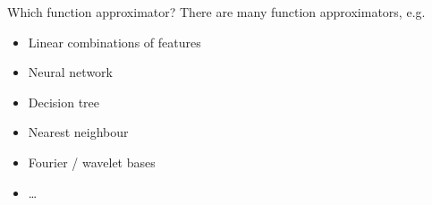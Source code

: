 \bgroup
\begin{frame}{Which function approximator?}
There are many function approximators, e.g.
\begin{itemize}
\item Linear combinations of features
\item Neural network
\item Decision tree
\item Nearest neighbour
\item Fourier / wavelet bases
\item \ldots
\end{itemize}
\end{frame}
\egroup